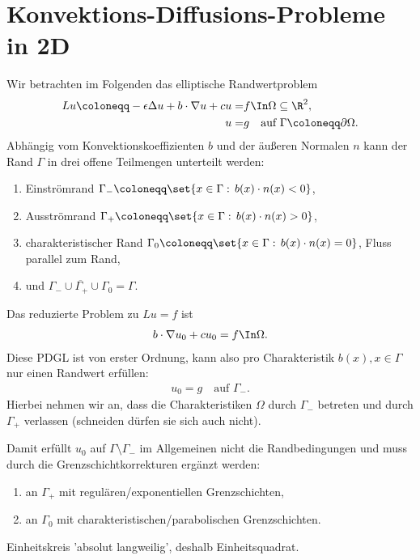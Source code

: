 
\section{Konvektions-Diffusions-Probleme in 2D}
\label{sec:konv-diff-probl}

Wir betrachten im Folgenden das elliptische Randwertproblem
\begin{align*}
  Lu \coloneqq - \epsilon \Delta u + b \cdot \nabla u + cu = & f \In \Omega \subseteq \R^{2},\\
u =& g \quad \text{auf } \Gamma \coloneqq \partial \Omega. 
\end{align*}
Abhängig vom Konvektionskoeffizienten $b$ und der äußeren Normalen $n$ kann der Rand $\Gamma$ in drei offene Teilmengen unterteilt werden:
\begin{enumerate}
\item Einströmrand $\Gamma_{-} \coloneqq \set{x \in \Gamma: \, b(x) \cdot n(x) < 0}$, 
\item Ausströmrand $\Gamma_{+} \coloneqq \set{x \in \Gamma: \, b(x) \cdot n(x) > 0}$, 
\item charakteristischer Rand $\Gamma_{0} \coloneqq \set{x \in \Gamma: \, b(x) \cdot n(x) = 0}$, Fluss parallel zum Rand, 
\item und $\overline{\Gamma_{-} \cup \Gamma_{+} \cup \Gamma_{0}} = \Gamma$. 
\end{enumerate}
Das reduzierte Problem zu $Lu = f$ ist
\begin{align*}
  b \cdot \nabla u_{0} + c u_{0}  = f \In \Omega. 
\end{align*}
Diese PDGL ist von erster Ordnung, kann also pro Charakteristik $b(x), x \in \Gamma$ nur einen Randwert erfüllen:
\begin{align*}
  u_{0} = g \quad \text{auf } \Gamma_{-}. 
\end{align*}
Hierbei nehmen wir an, dass die Charakteristiken $\Omega$ durch $\Gamma_{-}$ betreten und durch $\Gamma_{+}$ verlassen (schneiden dürfen sie sich auch nicht). 

Damit erfüllt $u_{0}$ auf $\Gamma\setminus\Gamma_{-}$ im Allgemeinen nicht die Randbedingungen und muss durch die Grenzschichtkorrekturen ergänzt werden:
\begin{enumerate}
\item an $\Gamma_{+}$ mit regulären/exponentiellen Grenzschichten, 
\item an $\Gamma_{0}$ mit charakteristischen/parabolischen Grenzschichten. 
\end{enumerate}
Einheitskreis 'absolut langweilig', deshalb Einheitsquadrat.

